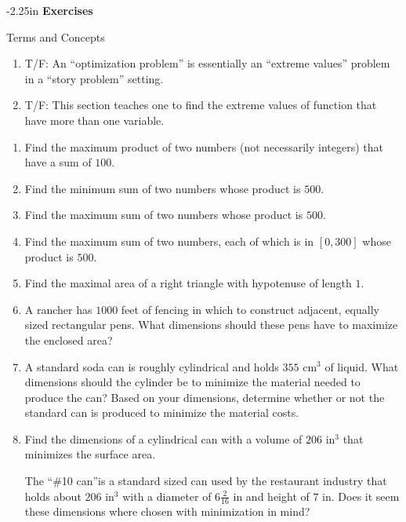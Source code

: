 \begin{adjustwidth*}{}{-2.25in}
\textbf{{\large Exercises}}
\setlength{\columnsep}{25pt}
\begin{multicols*}{2}
\noindent Terms and Concepts \small
\begin{enumerate}[1)]
\item T/F: An ``optimization problem'' is essentially an ``extreme values'' problem in a ``story problem'' setting.
\item T/F: This section teaches one to find the extreme values of function that have more than one variable.
\end{enumerate} 

 \small

\begin{enumerate}[1),resume]
\item Find the maximum product of two numbers (not necessarily integers) that have a sum of $100$.
\item Find the minimum sum of two numbers whose product is $500$.
\item Find the maximum sum of two numbers whose product is $500$.
\item Find the maximum sum of two numbers, each of which is in $[0,300]$ whose product is $500$.
\item Find the maximal area of a right triangle with hypotenuse of length $1$. 
\item A rancher has $1000$ feet of fencing in which to construct adjacent, equally sized rectangular pens. What dimensions should these pens have to maximize the enclosed area?

\noindent\begin{minipage}{\linewidth}
\centering{}
\end{minipage}

\item A standard soda can is roughly cylindrical and holds $355$ cm$^3$ of liquid. What dimensions should the cylinder be to minimize the material needed to produce the can? Based on your dimensions, determine whether or not the standard can is produced to minimize the material costs.
\item Find the dimensions of a cylindrical can with a volume of $206$ in$^3$ that minimizes the surface area.

The ``\#10 can''is a standard sized can used by the restaurant industry that holds about $206$ in$^3$ with a diameter of $6 \frac{2}{16}$ in and height of $7$ in. Does it seem these dimensions where chosen with minimization in mind?


\end{enumerate}
\end{multicols*}
\end{adjustwidth*}
